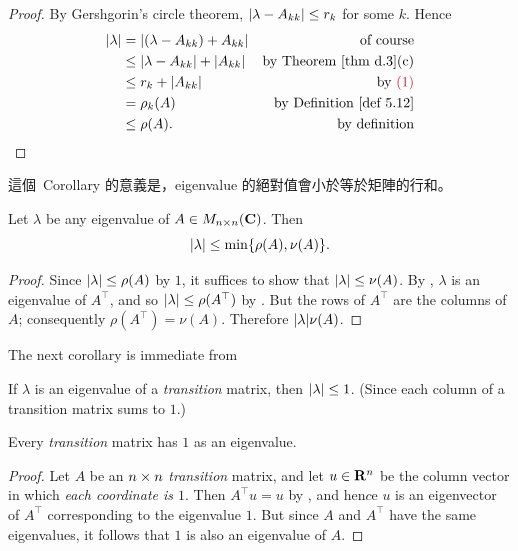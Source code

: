 \begin{proof}
By Gershgorin's circle theorem, \(\lvert\lambda - A_{kk}\rvert \le r_k\) for some \(k\).  \quad \quad
Hence
\begin{align*}
    \abs{\lambda} & = \abs{(\lambda - A_{kk}) + A_{kk}} & \text{of course} \\
        & \le \abs{\lambda - A_{kk}} + \abs{A_{kk}} & \text{by \THM{d.3}(c)} \\
        & \le r_k + \abs{A_{kk}} & \text{by \MAROON{(1)}} \\
        & = \rho_k(A) & \text{by \DEF{5.12}} \\
        & \le \rho(A). & \text{by definition}
\end{align*}
\end{proof}

\begin{note}
這個\ Corollary 的意義是，eigenvalue 的絕對值會小於等於矩陣的行和。
\end{note}

\begin{corollary} \label{corollary 5.15.2}
Let \(\lambda\) be any eigenvalue of \(A \in M_{n \times n}(\mathbf{C})\).
Then
\[
    \lvert\lambda\rvert \le \min \{ \rho(A), \nu(A) \}.
\]
\end{corollary}

\begin{proof}
Since \(\lvert\lambda\rvert \le \rho(A)\) by \(1\), it suffices to show that \(\lvert\lambda\rvert \le \nu(A)\).
By , \(\lambda\) is an eigenvalue of \(A^\top\), and so \(\lvert\lambda\rvert \le \rho(A^\top)\) by .
But the rows of \(A^\top\) are the columns of \(A\); consequently \(\rho(A^\top) = \nu(A)\).
Therefore \(\lvert\lambda\rvert \nu(A)\).
\end{proof}

The next corollary is immediate from 
\begin{corollary} \label{corollary 5.15.3}
If \(\lambda\) is an eigenvalue of a \emph{transition} matrix, then \(\lvert\lambda\rvert \le 1\).
(Since each column of a transition matrix sums to \(1\).)
\end{corollary}

\begin{theorem} \label{thm 5.16}
Every \emph{transition} matrix has \(1\) as an eigenvalue.
\end{theorem}

\begin{proof}
Let \(A\) be an \(n \times n\) \emph{transition} matrix, and let \(u \in \mathbf{R}^n\) be the column vector in which \emph{each coordinate is \(1\)}.
Then \(A^\top u = u\) by , and hen\(c\)e \(u\) is an eigenvector of \(A^\top\) corresponding to the eigenvalue \(1\). But since \(A\) and \(A^\top\) have the same eigenvalues, it follows that \(1\) is also an eigenvalue of \(A\).
\end{proof}

